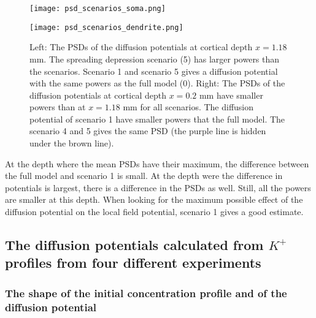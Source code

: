 \documentclass{article}
\begin{document}
\begin{figure}[!tbp]
  \centering
  \begin{minipage}[b]{0.45\textwidth}
    \texttt{[image: psd\_scenarios\_soma.png]}

  \end{minipage}
\hfill
  \begin{minipage}[b]{0.45\textwidth}
    \texttt{[image: psd\_scenarios\_dendrite.png]}

  \end{minipage}

  \caption{Left: The PSDs of the diffusion potentials at cortical depth $x=1.18$ mm. The spreading depression scenario (5) has larger powers than the scenarios. Scenario 1 and scenario 5 gives a diffusion potential with the same powers as the full model (0). 
  Right: The PSDs of the diffusion potentials at cortical depth $x=0.2$ mm have smaller powers than at $x=1.18$ mm for all scenarios. The diffusion potential of scenario 1 have smaller powers that the full model. The scenario 4 and 5 gives the same PSD (the purple line is hidden under the brown line). }
  \label{fig:psd_scenarios}
\end{figure} 

At the depth where the mean PSDs have their maximum, the difference between the full model and scenario 1 is small. At the depth were the difference in potentials is largest, there is a difference in the PSDs as well. Still, all the powers are smaller at this depth. When looking for the maximum possible effect of the diffusion potential on the local field potential, scenario 1 gives a good estimate. 
\subsection{The diffusion potentials calculated from $K^+$ profiles from four different experiments}\label{diffusion potentials}
\subsubsection{The shape of the initial concentration profile and of the diffusion potential}\label{c(x,t) and phi(x,t)}
\end{document}
